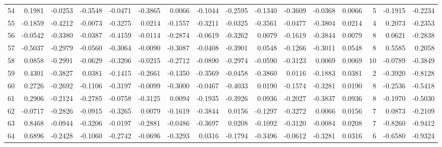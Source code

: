 \begin{tabular}{lrrrrrrrrrrrrrrr}
54  &      0.1981 & -0.0253 & -0.3548 & -0.0471 & -0.3865 &  0.0066 & -0.1044 & -0.2595 & -0.1340 & -0.3609 &  -0.0368 &     0.0066 &      5 &                   -0.1915 &                    -0.2234 \\
55  &     -0.1859 & -0.4212 & -0.0073 & -0.3275 &  0.0214 & -0.1557 & -0.3211 & -0.0325 & -0.3561 & -0.0477 &  -0.3804 &     0.0214 &      4 &                    0.2073 &                    -0.2353 \\
56  &     -0.0542 & -0.3380 & -0.0387 & -0.4159 & -0.0114 & -0.2874 & -0.0619 & -0.3262 &  0.0079 & -0.1619 &  -0.3844 &     0.0079 &      8 &                    0.0621 &                    -0.2838 \\
57  &     -0.5037 & -0.2979 & -0.0560 & -0.3064 & -0.0090 & -0.3087 & -0.0408 & -0.3901 &  0.0548 & -0.1266 &  -0.3011 &     0.0548 &      8 &                    0.5585 &                     0.2058 \\
58  &      0.0858 & -0.2991 & -0.0629 & -0.3206 & -0.0215 & -0.2712 & -0.0890 & -0.2974 & -0.0590 & -0.3123 &   0.0069 &     0.0069 &     10 &                   -0.0789 &                    -0.3849 \\
59  &      0.4301 & -0.3827 &  0.0381 & -0.1415 & -0.2661 & -0.1350 & -0.3569 & -0.0458 & -0.3860 &  0.0116 &  -0.1883 &     0.0381 &      2 &                   -0.3920 &                    -0.8128 \\
60  &      0.2726 & -0.2692 & -0.1106 & -0.3197 & -0.0099 & -0.3000 & -0.0467 & -0.4033 &  0.0190 & -0.1574 &  -0.3281 &     0.0190 &      8 &                   -0.2536 &                    -0.5418 \\
61  &      0.2906 & -0.2124 & -0.2785 & -0.0758 & -0.3125 &  0.0094 & -0.1935 & -0.3926 &  0.0936 & -0.2027 &  -0.3837 &     0.0936 &      8 &                   -0.1970 &                    -0.5030 \\
62  &     -0.0717 & -0.2826 & -0.0915 & -0.3265 &  0.0079 & -0.1619 & -0.3844 &  0.0156 & -0.1297 & -0.3272 &   0.0066 &     0.0156 &      7 &                    0.0873 &                    -0.2109 \\
63  &      0.8468 & -0.0944 & -0.3206 & -0.0197 & -0.2881 & -0.0486 & -0.3697 &  0.0208 & -0.1092 & -0.3120 &  -0.0084 &     0.0208 &      7 &                   -0.8260 &                    -0.9412 \\
64  &      0.6896 & -0.2428 & -0.1060 & -0.2742 & -0.0696 & -0.3293 &  0.0316 & -0.1794 & -0.3496 & -0.0612 &  -0.3281 &     0.0316 &      6 &                   -0.6580 &                    -0.9324 \\

\end{tabular}
